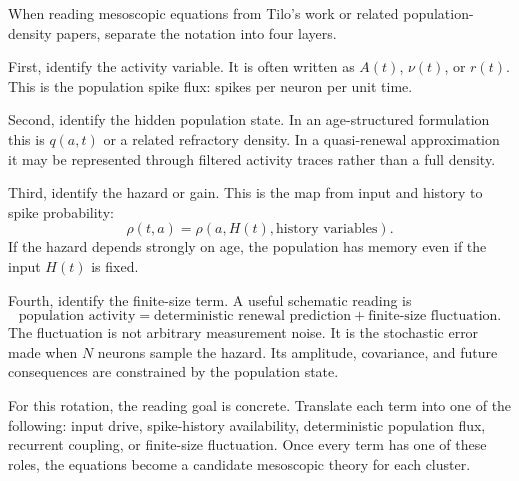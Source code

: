 When reading mesoscopic equations from Tilo's work or related population-density papers, separate the notation into four layers.

First, identify the activity variable. It is often written as $A(t)$, $\nu(t)$, or $r(t)$. This is the population spike flux: spikes per neuron per unit time.

Second, identify the hidden population state. In an age-structured formulation this is $q(a,t)$ or a related refractory density. In a quasi-renewal approximation it may be represented through filtered activity traces rather than a full density.

Third, identify the hazard or gain. This is the map from input and history to spike probability:
%
\begin{equation}
  \rho(t,a)
  =
  \rho\!\left(a, H(t), \text{history variables}\right).
  \label{eq:reading-hazard}
\end{equation}
%
If the hazard depends strongly on age, the population has memory even if the input $H(t)$ is fixed.

Fourth, identify the finite-size term. A useful schematic reading is
%
\begin{equation}
  \text{population activity}
  =
  \text{deterministic renewal prediction}
  +
  \text{finite-size fluctuation}.
  \label{eq:reading-finite-size-term}
\end{equation}
%
The fluctuation is not arbitrary measurement noise. It is the stochastic error made when $N$ neurons sample the hazard. Its amplitude, covariance, and future consequences are constrained by the population state.

For this rotation, the reading goal is concrete. Translate each term into one of the following: input drive, spike-history availability, deterministic population flux, recurrent coupling, or finite-size fluctuation. Once every term has one of these roles, the equations become a candidate mesoscopic theory for each cluster.

